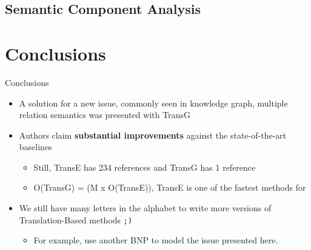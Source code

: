 \documentclass[xcolor={x11names,svgnames,dvipsnames},trans]{beamer}
\begin{document}
\subsection{Semantic Component Analysis}

\section{Conclusions}
\begin{frame}{Conclusions}

    \begin{itemize}
        \item A solution for a new issue, commonly seen in knowledge graph, multiple relation semantics was presented with TransG
        \item Authors claim \textbf{substantial improvements} against the state-of-the-art baselines
            \begin{itemize}
                \item Still, TransE has 234 references and TransG has 1 reference
                \item O(TransG)  = (M x O(TransE)), TransE is one of the fastest methods for
            \end{itemize}
        \item We still have many letters in the alphabet to write more versions of Translation-Based methods \texttt{;)}
            \begin{itemize}
                \item For example, use another BNP to model the issue presented here.
            \end{itemize}
    \end{itemize}

\end{frame}
\end{document}
